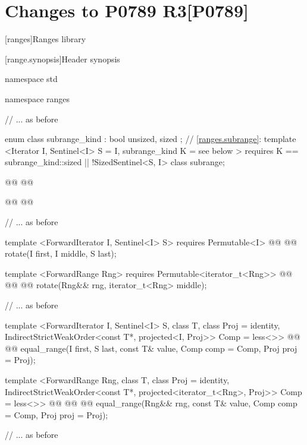 
\part[Changes to P0789 R3]{Changes to P0789 R3\hfill[P0789]}\label{P0789}

\setcounter{chapter}{28}
[ranges]{Ranges library}


\setcounter{section}{2}
[range.synopsis]{Header  synopsis}


\begin{codeblock}
namespace std { namespace ranges {
  // ... as before

  enum class subrange_kind : bool { unsized, sized };
  // \ref{ranges.subrange}:
  template <Iterator I, Sentinel<I> S = I, subrange_kind K = see below >
      requires K == subrange_kind::sized || !SizedSentinel<S, I>
  class subrange;

  @@
    @@

  @@
    @@

  // ... as before

  template <ForwardIterator I, Sentinel<I> S>
    requires Permutable<I>
    @@
    @@
      rotate(I first, I middle, S last);

  template <ForwardRange Rng>
    requires Permutable<iterator_t<Rng>>
    @@
                @@
    @@
      rotate(Rng&& rng, iterator_t<Rng> middle);

  // ... as before

  template <ForwardIterator I, Sentinel<I> S, class T, class Proj = identity,
      IndirectStrictWeakOrder<const T*, projected<I, Proj>> Comp = less<>>
    @@
    @@
      equal_range(I first, S last, const T& value, Comp comp = Comp{}, Proj proj = Proj{});

  template <ForwardRange Rng, class T, class Proj = identity,
      IndirectStrictWeakOrder<const T*, projected<iterator_t<Rng>, Proj>> Comp = less<>>
    @@
                @@
    @@
      equal_range(Rng&& rng, const T& value, Comp comp = Comp{}, Proj proj = Proj{});

  // ... as before
}}
\end{codeblock}

